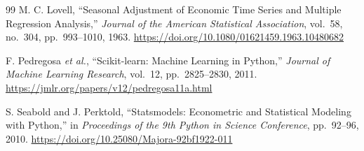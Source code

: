 \documentclass[11pt,a4paper]{article}
\begin{document}
\begin{thebibliography}{99}
M. C. Lovell, ``Seasonal Adjustment of Economic Time Series and Multiple Regression Analysis,'' \emph{Journal of the American Statistical Association}, vol.~58, no.~304, pp.~993--1010, 1963. \url{https://doi.org/10.1080/01621459.1963.10480682}

F. Pedregosa \emph{et al.}, ``Scikit-learn: Machine Learning in Python,'' \emph{Journal of Machine Learning Research}, vol.~12, pp.~2825--2830, 2011. \url{https://jmlr.org/papers/v12/pedregosa11a.html}

S. Seabold and J. Perktold, ``Statsmodels: Econometric and Statistical Modeling with Python,'' in \emph{Proceedings of the 9th Python in Science Conference}, pp.~92--96, 2010. \url{https://doi.org/10.25080/Majora-92bf1922-011}

\end{thebibliography}
\endgroup
\end{document}
